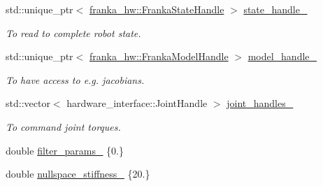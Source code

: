 \begin{DoxyCompactItemize}
\item 
\mbox{\label{structfranka__example__controllers_1_1_franka_data_container_a1c8c232a2ecb797c88f5f3275041df68}} 
std\+::unique\+\_\+ptr$<$ \hyperlink{classfranka__hw_1_1_franka_state_handle}{franka\+\_\+hw\+::\+Franka\+State\+Handle} $>$ \hyperlink{structfranka__example__controllers_1_1_franka_data_container_a1c8c232a2ecb797c88f5f3275041df68}{state\+\_\+handle\+\_\+}
\begin{DoxyCompactList}\small\item\em To read to complete robot state. \end{DoxyCompactList}\item 
\mbox{\label{structfranka__example__controllers_1_1_franka_data_container_a858db623881ae7b6c1cac38f8cd2e2b8}} 
std\+::unique\+\_\+ptr$<$ \hyperlink{classfranka__hw_1_1_franka_model_handle}{franka\+\_\+hw\+::\+Franka\+Model\+Handle} $>$ \hyperlink{structfranka__example__controllers_1_1_franka_data_container_a858db623881ae7b6c1cac38f8cd2e2b8}{model\+\_\+handle\+\_\+}
\begin{DoxyCompactList}\small\item\em To have access to e.\+g. jacobians. \end{DoxyCompactList}\item 
\mbox{\label{structfranka__example__controllers_1_1_franka_data_container_a622e083f08e43ad3484d17e31747d056}} 
std\+::vector$<$ hardware\+\_\+interface\+::\+Joint\+Handle $>$ \hyperlink{structfranka__example__controllers_1_1_franka_data_container_a622e083f08e43ad3484d17e31747d056}{joint\+\_\+handles\+\_\+}
\begin{DoxyCompactList}\small\item\em To command joint torques. \end{DoxyCompactList}\item 
double \hyperlink{structfranka__example__controllers_1_1_franka_data_container_ab503b23d78faa358cf36aba04731fb12}{filter\+\_\+params\+\_\+} \{0.\}
\item 
double \hyperlink{structfranka__example__controllers_1_1_franka_data_container_af9d3b21edd5040627aa43bf68ec84bca}{nullspace\+\_\+stiffness\+\_\+} \{20.\}

\end{DoxyCompactItemize}
